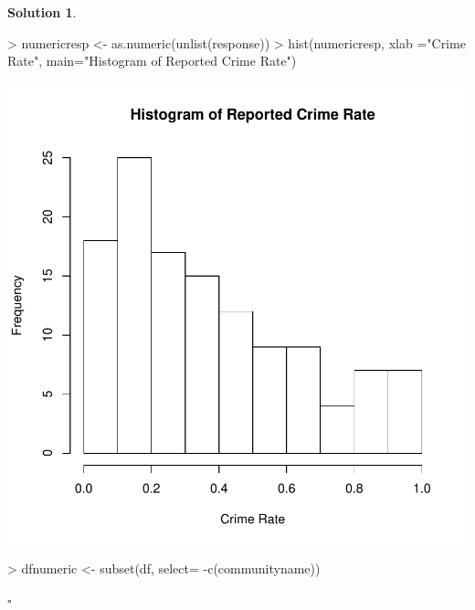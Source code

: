\documentclass[twoside]{article}
\theoremstyle{definition}
\newtheorem*{solutionT}{Solution}
\newenvironment{solution}{\begin{cBox}\begin{solutionT}}{\hfill{\scriptsize\ensuremath{\square}}\end{solutionT}\end{cBox}}
\theoremstyle{definition}
\begin{document}
\begin{enumerate}
\begin{solution}
\begin{Schunk}
\begin{Sinput}
> numericresp <- as.numeric(unlist(response))
> hist(numericresp, xlab ="Crime Rate", main="Histogram of Reported Crime Rate")
\end{Sinput}
\end{Schunk}
\includegraphics{week1-019}
\begin{Schunk}
\begin{Sinput}
> dfnumeric <- subset(df, select= -c(communityname))
\end{Sinput}
\end{Schunk}


\end{solution}
\end{enumerate}
\end{document}
